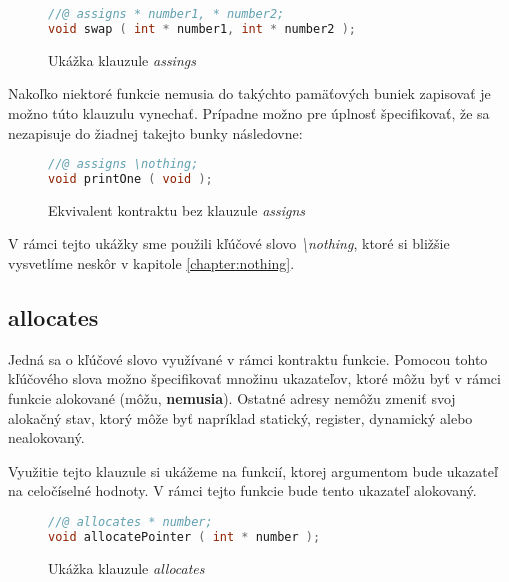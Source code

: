 \begin{figure}[H]
    \centering
    \captionsetup{justification=centering}
\begin{lstlisting}[language=C]
//@ assigns * number1, * number2;
void swap ( int * number1, int * number2 );
\end{lstlisting}
    \caption{Ukážka klauzule \emph{assings}}
    \label{fig:kontrakt-assigns}
\end{figure}

Nakoľko niektoré funkcie nemusia do takýchto pamäťových buniek zapisovať je možno túto klauzulu vynechať. Prípadne možno pre úplnosť špecifikovať, že sa nezapisuje do žiadnej takejto bunky následovne:

\begin{figure}[H]
    \centering
    \captionsetup{justification=centering}
\begin{lstlisting}[language=C]
//@ assigns \nothing;
void printOne ( void );
\end{lstlisting}
    \caption{Ekvivalent kontraktu bez klauzule \emph{assigns}}
    \label{fig:kontrakt-bez-ensures}
\end{figure}

V rámci tejto ukážky sme použili kľúčové slovo \emph{\textbackslash nothing}, ktoré si bližšie vysvetlíme neskôr v kapitole \ref{chapter:nothing}.

\subsection{allocates}

Jedná sa o kľúčové slovo využívané v rámci kontraktu funkcie. Pomocou tohto kľúčového slova možno špecifikovať množinu ukazateľov, ktoré môžu byť v rámci funkcie alokované (môžu, \textbf{nemusia}). Ostatné adresy nemôžu zmeniť svoj alokačný stav, ktorý môže byť napríklad statický, register, dynamický alebo nealokovaný. \cite{alokacne-stavy-acsl}

Využitie tejto klauzule si ukážeme na funkcií, ktorej argumentom bude ukazateľ na celočíselné hodnoty. V rámci tejto funkcie bude tento ukazateľ alokovaný.

\begin{figure}[H]
    \centering
    \captionsetup{justification=centering}
\begin{lstlisting}[language=C]
//@ allocates * number;
void allocatePointer ( int * number );
\end{lstlisting}
    \caption{Ukážka klauzule \emph{allocates}}
    \label{fig:kontrakt-allocates}
\end{figure}

